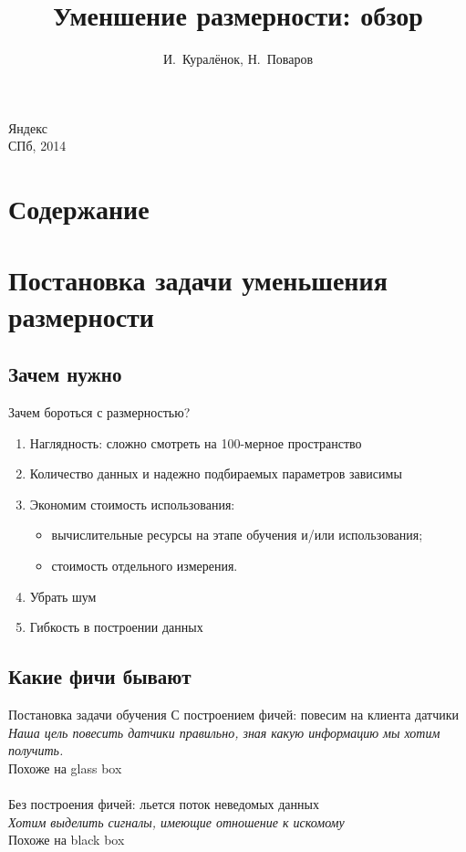 \documentclass[14pt, fleqn, xcolor={dvipsnames, table}]{beamer}
\title{Уменшение размерности: обзор\\\small{}}
\author[]{\small{%
И.~Куралёнок,
Н.~Поваров}}
\date{}
\begin{document}
\begin{frame}
\maketitle
\small
\begin{center}
\vspace{-60pt}
\normalsize {\color{red}Я}ндекс \\
\vspace{80pt}
\footnotesize СПб, 2014
\end{center}
\end{frame}

\section{Содержание}
\section{Постановка задачи уменьшения размерности}
\subsection{Зачем нужно}
\begin{frame}{Зачем бороться с размерностью?}
\begin{enumerate}
  \item Наглядность: сложно смотреть на 100-мерное пространство
  \item Количество данных и надежно подбираемых параметров зависимы
  \item Экономим стоимость использования:
  \begin{itemize}
    \item вычислительные ресурсы на этапе обучения и/или использования;
    \item стоимость отдельного измерения.
  \end{itemize}
  \item Убрать шум
  \item Гибкость в построении данных
\end{enumerate}
\end{frame}

\subsection{Какие фичи бывают}
\begin{frame}{Постановка задачи обучения}{}
{\color{blue}С построением фичей}: повесим на клиента датчики \\
\textit{Наша цель повесить датчики правильно, зная какую информацию мы хотим получить.}\\
Похоже на glass box\\
~\\
{\color{blue}Без построения фичей}: льется поток неведомых данных \\
\textit{Хотим выделить сигналы, имеющие отношение к искомому} \\
Похоже на black box
\end{frame}
\end{document}
